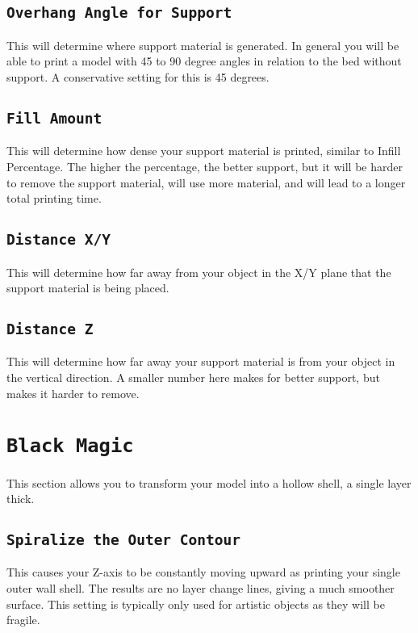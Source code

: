 \subsection{\texttt{Overhang Angle for Support}}
This will determine where support material is generated. In general you will be able to print a model with 45 to 90 degree angles in relation to the bed without support. A conservative setting for this is 45 degrees.

\subsection{\texttt{Fill Amount}}
This will determine how dense your support material is printed, similar to Infill Percentage. The higher the percentage, the better support, but it will be harder to remove the support material, will use more material, and will lead to a longer total printing time.

\subsection{\texttt{Distance X/Y}}
This will determine how far away from your object in the X/Y plane that the support material is being placed.

\subsection{\texttt{Distance Z}}
This will determine how far away your support material is from your object in the vertical direction. A smaller number here makes for better support, but makes it harder to remove.

\section{\texttt{Black Magic}}
This section allows you to transform your model into a hollow shell, a single layer thick.

\subsection{\texttt{Spiralize the Outer Contour}}
This causes your Z-axis to be constantly moving upward as printing your single outer wall shell. The results are no layer change lines, giving a much smoother surface. This setting is typically only used for artistic objects as they will be fragile.

